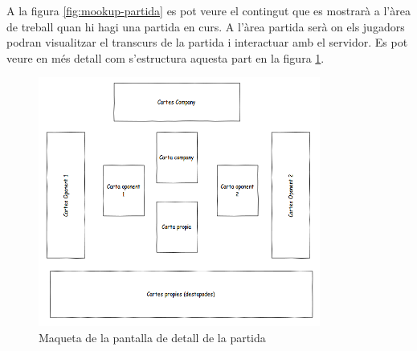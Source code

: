 A la figura \ref{fig:mookup-partida} es pot veure el contingut que es mostrarà a l'àrea de treball quan hi hagi una partida en curs. A l'àrea partida serà on els jugadors podran visualitzar el transcurs de la partida i interactuar amb el servidor. Es pot veure en més detall com s'estructura aquesta part en la figura \ref{fig:mookup-detall}.
\begin{figure}[htbp]
\centering\includegraphics{img/Detall_partida.png}
\caption{Maqueta de la pantalla de detall de la partida}
\label{fig:mookup-detall}
\end{figure} 

